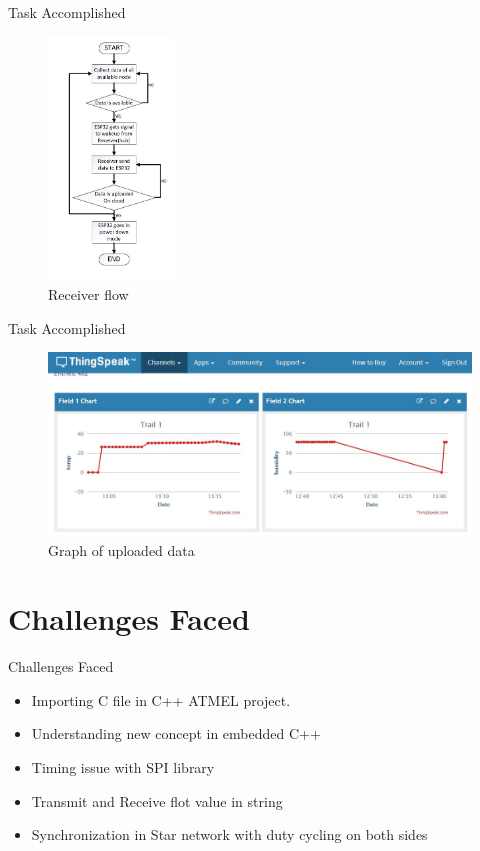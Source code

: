 \documentclass[10pt, a4paper]{beamer}
\begin{document}
\begin{frame}{Task Accomplished}
\begin{figure}
\begin{center}
\includegraphics[width=0.3\textwidth]{receiver_flow_snap.JPG}
\caption{Receiver flow}
\end{center}
\end{figure}
\end {frame}


\begin{frame}{Task Accomplished}
\begin{figure}
\begin{center}
\includegraphics[width=1\textwidth]{graph_thingspeak.JPG}
\caption{Graph of uploaded data}
\end{center}
\end{figure}
\end {frame}


\section{Challenges Faced}
\begin{frame}{Challenges Faced}
	\begin{itemize}
		\item Importing C file in C++ ATMEL project.
        \item Understanding new concept in embedded C++
        \item Timing issue with SPI library
        \item Transmit and Receive flot value in string 
        \item Synchronization in Star network with duty cycling on both sides
	\end{itemize} 
\end{frame}
\end{document}
